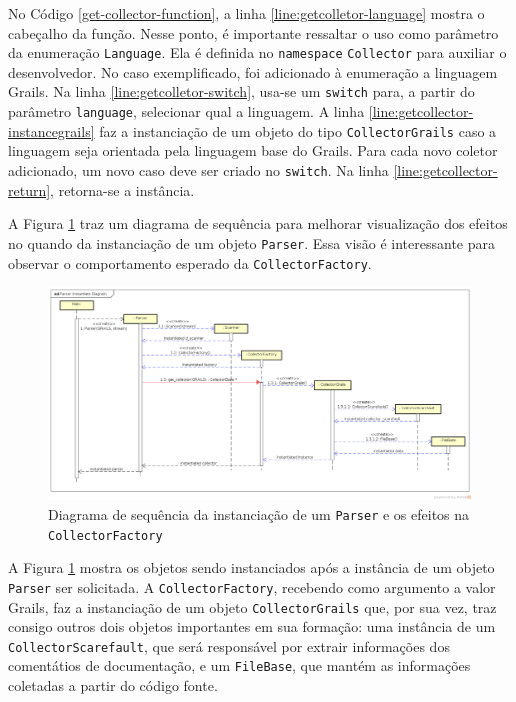 No Código \ref{get-collector-function}, a linha \ref{line:getcolletor-language}
mostra o cabeçalho da função. Nesse ponto, é importante ressaltar o uso como
parâmetro da enumeração \lstinline|Language|. Ela é definida no \lstinline|namespace|
\lstinline|Collector| para auxiliar o desenvolvedor. No caso exemplificado, foi
adicionado à enumeração a linguagem \textsf{Grails}. Na linha
\ref{line:getcolletor-switch}, usa-se um \lstinline|switch| para, a partir do parâmetro
\lstinline|language|, selecionar qual a linguagem. A linha
\ref{line:getcollector-instancegrails} faz a instanciação de um objeto do tipo
\lstinline|CollectorGrails| caso a linguagem seja orientada pela linguagem base do \textsf{Grails}. Para cada novo
coletor adicionado, um novo caso deve ser criado no \lstinline|switch|. Na linha
\ref{line:getcollector-return}, retorna-se a instância.

A Figura \ref{parser-instance-sequence-diagram} traz um diagrama de sequência para melhorar
visualização dos efeitos no \scarefault quando da instanciação de um objeto \lstinline|Parser|.
Essa visão é interessante para observar o comportamento esperado da
\lstinline|CollectorFactory|.
\begin{landscape}
\begin{figure}[h]
  \centering
    \includegraphics[width=1.5\textwidth]{figuras/parser-instance-sequence-diagram.png}
    \caption{Diagrama de sequência da instanciação de um \lstinline|Parser| e os efeitos na \lstinline|CollectorFactory|}
    \label{parser-instance-sequence-diagram}
\end{figure}
\FloatBarrier
\end{landscape}

A Figura \ref{parser-instance-sequence-diagram} mostra os objetos sendo
instanciados após a instância de um objeto \lstinline|Parser| ser solicitada.
A \lstinline|CollectorFactory|, recebendo como argumento a valor \textsf{Grails},
faz a instanciação de um objeto \lstinline|CollectorGrails| que, por sua vez,
traz consigo outros dois objetos importantes em sua formação: uma instância de um
\lstinline|CollectorScarefault|, que será responsável por extrair informações
dos comentátios de documentação, e um \lstinline|FileBase|, que mantém as informações
coletadas a partir do código fonte.

